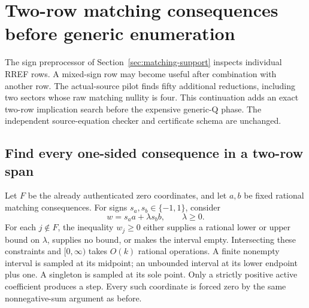 \section{Two-row matching consequences before generic enumeration}
\label{sec:matching-pairs}

The sign preprocessor of Section~\ref{sec:matching-support} inspects individual
RREF rows. A mixed-sign row may become useful after combination with another
row. The actual-source pilot finds fifty additional reductions, including
two sectors whose raw matching nullity is four. This continuation adds an
exact two-row implication search before the expensive generic-Q phase.
The independent source-equation checker and certificate schema are unchanged.

\subsection{Find every one-sided consequence in a two-row span}

Let $F$ be the already authenticated zero coordinates, and let $a,b$ be
fixed rational matching consequences. For signs $s_a,s_b\in\{-1,1\}$,
consider
\[
              w=s_a a+\lambda s_b b,\qquad\lambda\ge0.
\]
For each $j\notin F$, the inequality $w_j\ge0$ either supplies a rational
lower or upper bound on $\lambda$, supplies no bound, or makes the interval
empty. Intersecting these constraints and $[0,\infty)$ takes $O(k)$
rational operations. A finite nonempty interval is sampled at its midpoint;
an unbounded interval at its lower endpoint plus one. A singleton is
sampled at its sole point. Only a strictly positive active coefficient
produces a step. Every such coordinate is forced zero by the same
nonnegative-sum argument as before.

